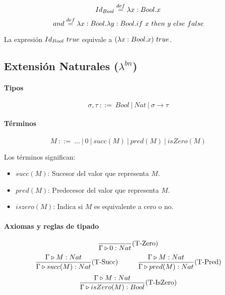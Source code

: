 $$Id_{Bool} \overset{def}{=} \lambda x: Bool . x$$
$$and \overset{def}{=} \lambda x: Bool . \lambda y: Bool . if~ x~ then~ y~ else~ false$$

La expresión $Id_{Bool}~true$ equivale a $(\lambda x: Bool . x)~true$.
\subsection{Extensión Naturales (\texorpdfstring{$\lambda^{bn}$}{lambda bn})}

\paragraph{Tipos}
$$\sigma, \tau ~::=~ Bool~|~Nat~|~\sigma\to\tau$$

\paragraph{Términos}
$$ M~::=~ \dots~|~0~|~succ(M)~|~pred(M)~|~isZero(M) $$

Los términos significan:
\begin{itemize}
	\item $succ(M)$: Sucesor del valor que representa $M$.
	\item $pred(M)$: Predecesor del valor que representa $M$.
	\item $iszero(M)$: Indica si $M$ es equivalente a cero o no.
\end{itemize}

\paragraph{Axiomas y reglas de tipado}
\begin{equation*}
	\frac{}{\Gamma\triangleright 0 : Nat}(\text{T-Zero})
\end{equation*}
\vspace*{5mm}
\begin{equation*}
	\frac{\Gamma\triangleright M : Nat}
	{\Gamma\triangleright succ(M) : Nat}(\text{T-Succ})\hspace*{1cm}
	\frac{\Gamma\triangleright M : Nat}{\Gamma\triangleright pred(M) : Nat}(\text{T-Pred})
\end{equation*}
\vspace*{5mm}
\begin{equation*}
	\frac{\Gamma\triangleright M : Nat}{\Gamma\triangleright isZero(M) : Bool}(\text{T-IsZero})
\end{equation*}

